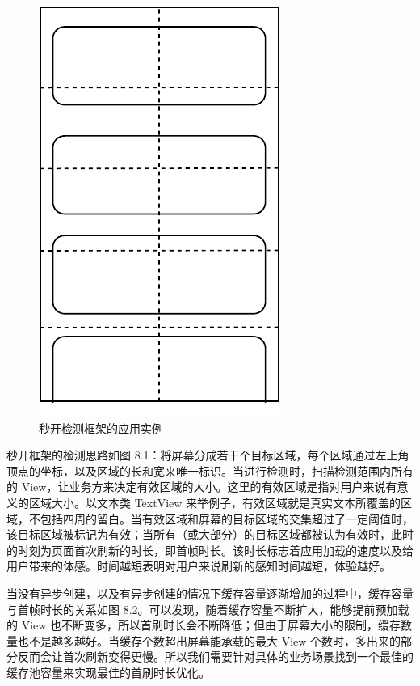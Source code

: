 \begin{figure}
    \centering
    \includegraphics{assets/visibility-check.pdf}
    \caption{秒开检测框架的应用实例}
\end{figure}



秒开框架的检测思路如图 8.1：将屏幕分成若干个目标区域，每个区域通过左上角顶点的坐标，以及区域的长和宽来唯一标识。当进行检测时，扫描检测范围内所有的 View，让业务方来决定有效区域的大小。这里的有效区域是指对用户来说有意义的区域大小。以文本类 TextView 来举例子，有效区域就是真实文本所覆盖的区域，不包括四周的留白。当有效区域和屏幕的目标区域的交集超过了一定阈值时，该目标区域被标记为有效；当所有（或大部分）的目标区域都被认为有效时，此时的时刻为页面首次刷新的时长，即首帧时长。该时长标志着应用加载的速度以及给用户带来的体感。时间越短表明对用户来说刷新的感知时间越短，体验越好。

当没有异步创建，以及有异步创建的情况下缓存容量逐渐增加的过程中，缓存容量与首帧时长的关系如图 8.2。可以发现，随着缓存容量不断扩大，能够提前预加载的 View 也不断变多，所以首刷时长会不断降低；但由于屏幕大小的限制，缓存数量也不是越多越好。当缓存个数超出屏幕能承载的最大 View 个数时，多出来的部分反而会让首次刷新变得更慢。所以我们需要针对具体的业务场景找到一个最佳的缓存池容量来实现最佳的首刷时长优化。